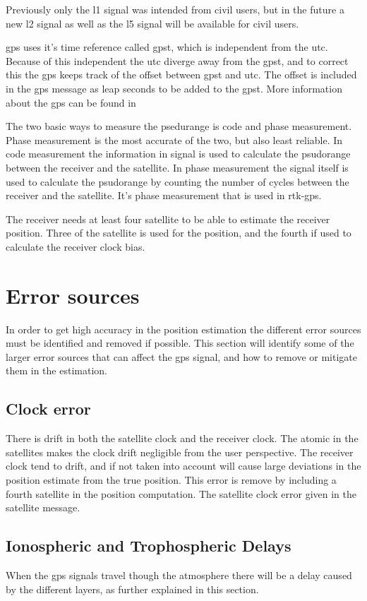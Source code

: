 Previously only the \gls{l1} signal was intended from civil users, but in the future a new {l2} signal as well as the \gls{l5} signal will be available for civil users. 

\gls{gps} uses it's time reference called \gls{gpst}, which is independent from the \gls{utc}. Because of this independent the \gls{utc} diverge away from the \gls{gpst}, and to correct this the \gls{gps} keeps track of the offset between \gls{gpst} and \gls{utc}. The offset is included in the \gls{gps} message as leap seconds to be added to the \gls{gpst}. More information about the \gls{gps} can be found in \citep{GPSBOOK,vik2014integrated} 

The two basic ways to measure the psedurange is code and phase measurement. Phase measurement is the most accurate of the two, but also least reliable.
In code measurement the information in signal is used to calculate the psudorange between the receiver and the satellite. In phase measurement the signal itself is used to calculate the psudorange by counting the number of cycles between the receiver and the satellite. It's phase measurement that is used in \gls{rtk-gps}.

The receiver needs at least four satellite to be able to estimate the receiver position. Three of the satellite is used for the position, and the fourth if used to calculate the receiver clock bias. 
 
\section{Error sources}
In order to get high accuracy in the position estimation the different error sources must be identified and removed if possible. This section will identify some of the larger error sources that can affect the \gls{gps} signal, and how to remove or mitigate them in the estimation.
\subsection{Clock error}
There is drift in both the satellite clock and the receiver clock. The atomic in the satellites makes the clock drift negligible from the user perspective. The receiver clock tend to drift, and if not taken into account will cause large deviations in the position estimate from the true position. This error is remove by including a fourth satellite in the position computation. The satellite clock error given in the satellite message. 

\subsection{Ionospheric and Trophospheric Delays}
When the \gls{gps} signals travel though the atmosphere there will be a delay caused by the different layers, as further explained in this section.
